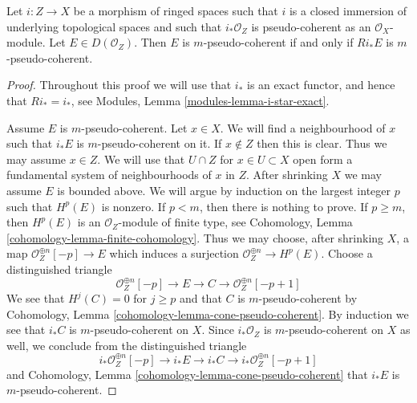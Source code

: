 \begin{lemma}
\label{lemma-closed-push-pseudo-coherent}
Let $i : Z \to X$ be a morphism of ringed spaces such that
$i$ is a closed immersion of underlying topological spaces and such that
$i_*\mathcal{O}_Z$ is pseudo-coherent as an $\mathcal{O}_X$-module.
Let $E \in D(\mathcal{O}_Z)$. Then $E$ is $m$-pseudo-coherent
if and only if $Ri_*E$ is $m$-pseudo-coherent.
\end{lemma}

\begin{proof}
Throughout this proof we will use that $i_*$ is an exact functor, and
hence that $Ri_* = i_*$, see Modules, Lemma \ref{modules-lemma-i-star-exact}.

\medskip\noindent
Assume $E$ is $m$-pseudo-coherent. Let $x \in X$. We will find a neighbourhood
of $x$ such that $i_*E$ is $m$-pseudo-coherent on it. If $x \not \in Z$
then this is clear. Thus we may assume $x \in Z$. We will use
that $U \cap Z$ for $x \in U \subset X$ open form a fundamental system of
neighbourhoods of $x$ in $Z$. After shrinking $X$ we may assume $E$ is
bounded above. We will argue by induction on
the largest integer $p$ such that $H^p(E)$ is nonzero. If $p < m$, then
there is nothing to prove. If $p \geq m$, then $H^p(E)$ is an
$\mathcal{O}_Z$-module of finite type, see
Cohomology, Lemma \ref{cohomology-lemma-finite-cohomology}.
Thus we may choose, after shrinking $X$, a map
$\mathcal{O}_Z^{\oplus n}[-p] \to E$ which induces a surjection
$\mathcal{O}_Z^{\oplus n} \to H^p(E)$. Choose a distinguished triangle
$$
\mathcal{O}_Z^{\oplus n}[-p] \to E \to C \to \mathcal{O}_Z^{\oplus n}[-p + 1]
$$
We see that $H^j(C) = 0$ for $j \geq p$ and that $C$ is $m$-pseudo-coherent
by Cohomology, Lemma \ref{cohomology-lemma-cone-pseudo-coherent}.
By induction we see that $i_*C$ is $m$-pseudo-coherent on $X$.
Since $i_*\mathcal{O}_Z$ is $m$-pseudo-coherent on $X$ as well, we conclude
from the distinguished triangle
$$
i_*\mathcal{O}_Z^{\oplus n}[-p] \to i_*E \to i_*C \to
i_*\mathcal{O}_Z^{\oplus n}[-p + 1]
$$
and 
Cohomology, Lemma \ref{cohomology-lemma-cone-pseudo-coherent}
that $i_*E$ is $m$-pseudo-coherent.


\end{proof}
